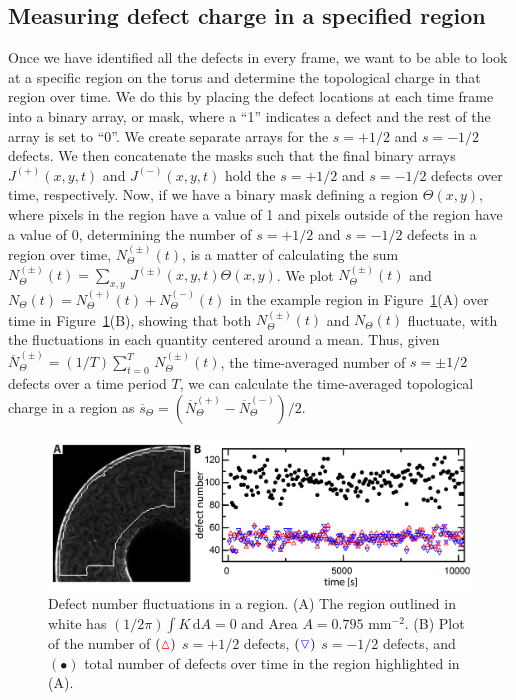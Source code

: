 \subsection{Measuring defect charge in a specified region}
Once we have identified all the defects in every frame, we want to be able to look at a specific region on the torus and determine the topological charge in that region over time.
We do this by placing the defect locations at each time frame into a binary array, or mask, where a ``1'' indicates a defect and the rest of the array is set to ``0''.
We create separate arrays for the $s = + 1/2$ and $s = - 1/2$ defects.
We then concatenate the masks such that the final binary arrays $J^{(+)}(x,y,t)$ and $J^{(-)}(x,y,t)$ hold the $s = +1/2$ and $s = -1/2$ defects over time, respectively.
Now, if we have a binary mask defining a region $\Theta(x,y)$, where pixels in the region have a value of 1 and pixels outside of the region have a value of $0$, determining the number of $s = +1/2$ and $s = -1/2$ defects in a region over time, $N^{(\pm)}_{\Theta}(t)$, is a matter of calculating the sum $N^{(\pm)}_{\Theta}(t) = \sum\limits_{x,y}\,J^{(\pm)}(x,y,t)\Theta(x,y)$.
We plot $N^{(\pm)}_{\Theta}(t)$ and $N_{\Theta}(t) = N^{(+)}_{\Theta}(t) + N^{(-)}_{\Theta}(t)$ in the example region in Figure~\ref{f:3-NumberOverTime}(A) over time in Figure~\ref{f:3-NumberOverTime}(B), showing that both $N^{(\pm)}_{\Theta}(t)$ and $N_{\Theta}(t)$ fluctuate, with the fluctuations in each quantity centered around a mean.
Thus, given $\overbar{N}^{(\pm)}_{\Theta} = (1/T)\sum\limits_{t = 0}^T \, N^{(\pm)}_{\Theta}(t)$, the time-averaged number of $s = \pm 1/2$ defects over a time period $T$, we can calculate the time-averaged topological charge in a region as $\overbar{s}_{\Theta} = (\overbar{N}^{(+)}_{\Theta} - \overbar{N}^{(-)}_{\Theta})/2$.
\begin{figure}
  \centering
  \includegraphics{figures/C3/Ch3-Figs_NumberOverTime.png}
  \caption{Defect number fluctuations in a region.
  (A) The region outlined in white has $(1/2\pi)\int K\, \textrm{d}A = 0$ and Area $A = 0.795$ mm$^{-2}$.
  (B) Plot of the number of $({\color{red} \vartriangle})$ $s = + 1/2$ defects, $({\color{blue} \triangledown})$ $s = -1/2$ defects, and $(\bullet)$ total number of defects over time in the region highlighted in (A).}\label{f:3-NumberOverTime}
\end{figure}

